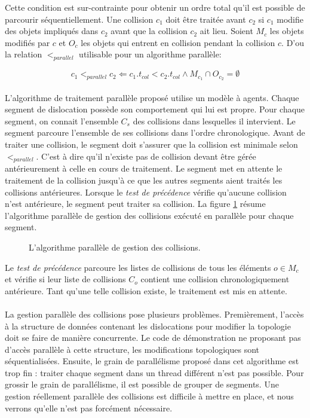 \documentclass[11pt,class=article,float=false,crop=false]{standalone}
\begin{document}
Cette condition est sur-contrainte pour obtenir un ordre total qu'il est possible de parcourir séquentiellement. Une collision $c_1$ doit être traitée avant $c_2$ si $c_1$ modifie des objets impliqués dans $c_2$ avant que la collision $c_2$ ait lieu. Soient $M_c$ les objets modifiés par $c$ et $O_c$ les objets qui entrent en collision pendant la collision $c$. D'ou la relation $<_{parallel}$ utilisable pour un algorithme parallèle:

\begin{equation}
c_1 <_{parallel} c_2 \Leftarrow c_1.t_{col} < c_2.t_{col} \wedge M_{c_1} \cap O_{c_2} = \emptyset
\end{equation}

\paragraph{}
L'algorithme de traitement parallèle proposé utilise un modèle à agents. Chaque segment de dislocation possède son comportement qui lui est propre. Pour chaque segment, on connait l'ensemble  $C_s$ des collisions dans lesquelles il intervient. Le segment parcoure l'ensemble de ses collisions dans l'ordre chronologique. Avant de traiter une collision, le segment doit s'assurer que la collision est minimale selon $<_{parallel}$. C'est à dire qu'il n'existe pas de collision devant être gérée antérieurement à celle en cours de traitement. Le segment met en attente le traitement de la collision jusqu'à ce que les autres segments aient traités les collisions antérieures. Lorsque le \textit{test de précédence} vérifie qu'aucune collision n'est antérieure, le segment peut traiter sa collision. La figure \ref{fig:collision_algo_parallele} résume l'algorithme parallèle de gestion des collisions exécuté en parallèle pour chaque segment.

\begin{figure}[h]
	\centering
	\caption{L'algorithme parallèle de gestion des collisions.}
	\label{fig:collision_algo_parallele}
\end{figure}

Le \textit{test de précédence} parcoure les listes de collisions de tous les éléments $o \in M_c$ et vérifie si leur liste de collisions $C_o$ contient une collision chronologiquement antérieure. Tant qu'une telle collision existe, le traitement est mis en attente.

\paragraph{}
La gestion parallèle des collisions pose plusieurs problèmes. Premièrement, l'accès à la structure de données contenant les dislocations pour modifier la topologie doit se faire de manière concurrente. Le code de démonstration ne proposant pas d'accès parallèle à cette structure, les modifications topologiques sont séquentialisées. Ensuite, le grain de parallélisme proposé dans cet algorithme est trop fin : traiter chaque segment dans un thread différent n'est pas possible. Pour grossir le grain de parallélisme, il est possible de grouper de segments. Une gestion réellement parallèle des collisions est difficile à mettre en place, et nous verrons qu'elle n'est pas forcément nécessaire.
\end{document}
